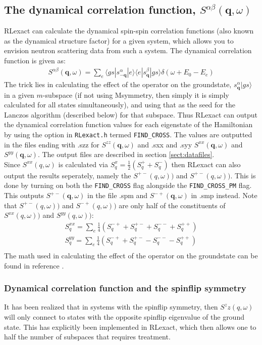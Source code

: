 \documentclass{article}
\begin{document}
\subsection{The dynamical correlation function, $S^{\alpha \beta}(\mathbf{q},\omega)$}
RLexact can calculate the dynamical spin-spin correlation functions (also known as the dynamical structure factor) for a given system, which allows you to envision neutron scattering data from such a system. The dynamical correlation function is given as:
\begin{align}
S^{\alpha \beta}(\mathbf{q},\omega) = \sum_e \langle gs | s^\alpha_{\mathbf{-q}} | e \rangle
\langle e | s^\beta_{\mathbf{q}} | gs \rangle \delta(\omega + E_0 - E_e)
\end{align}
The trick lies in calculating the effect of the operator on the groundstate, $s^\alpha_{\mathbf{q}}|gs\rangle$ in a given $m$-subspace (if not using Msymmetry, then simply it is simply calculated for all states simultaneously), and using that as the seed for the Lanczos algorithm (described below) for that subspace. Thus RLexact can output the dynamical correlation function values for each eigenstate of the Hamiltonian by using the option in \texttt{RLexact.h} termed \texttt{FIND\_CROSS}. The values are outputted in the files ending with .szz for $S^{zz}(\mathbf{q},\omega)$ and .sxx and .syy $S^{xx}(\mathbf{q},\omega)$ and $S^{yy}(\mathbf{q},\omega)$. The output files are described in section \ref{sect:datafiles}.\\
Since $S^{xx}(q,\omega)$ is calculated via $S^x_q = \frac{1}{2} (S^+_q + S^-_q)$ then RLexact can also output the results seperately, namely the $S^{+-}(q,\omega))$ and $S^{+-}(q,\omega))$. This is done by turning on both the \texttt{FIND\_CROSS} flag alongside the \texttt{FIND\_CROSS\_PM} flag. This outputs $S^{+-}(\mathbf{q},\omega)$ in the file .spm and $S^{-+}(\mathbf{q},\omega)$ in .smp instead. Note that $S^{+-}(q,\omega))$ and $S^{-+}(q,\omega))$ are only half of the constituents of $S^{xx}(q,\omega))$ and $S^{yy}(q,\omega))$:
\begin{align}
S^{xx}_q = \sum_e \frac{1}{4} \left( S^{-+}_q + S^{+-}_q + S^{--}_q+ S^{++}_q \right) \\
S^{yy}_q = \sum_e \frac{1}{4} \left( S^{-+}_q + S^{+-}_q - S^{--}_q- S^{++}_q \right) \\
\end{align}
The math used in calculating the effect of the operator on the groundstate can be found in reference \cite{SJ}.

\subsubsection{Dynamical correlation function and the spinflip symmetry}
It has been realized that in systems with the spinflip symmetry, then $S^zz(q,\omega)$ will only connect to states with the opposite spinflip eigenvalue of the ground state. This has explicitly been implemented in RLexact, which then allows one to half the number of subspaces that requires treatment.
\end{document}
